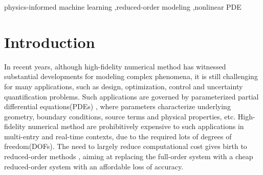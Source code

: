 \documentclass[preprint, 10pt]{elsarticle}
\begin{document}
\begin{frontmatter}
\begin{abstract}
\end{abstract}

\begin{keyword}
   physics-informed machine learning \sep reduced-order modeling \sep nonlinear PDE



\end{keyword}

\end{frontmatter}


\section{Introduction}
In recent years, although high-fidelity numerical method has witnessed substantial developments for modeling complex phenomena, it is still challenging for many applications, such as design, optimization, control and uncertainty quantification problems. Such applications are governed by parameterized partial differential equations(PDEs) \cite{hesthaven2016certified, quarteroni2015reduced}, where parameters characterize underlying geometry, boundary conditions, source terms and physical properties, etc. High-fidelity numerical method are prohibitively expensive to such applications in multi-entry and real-time contexts, due to the required lots of degrees of freedom(DOFs).
The need to largely reduce computational cost gives birth to reduced-order methods \cite{lucia2004reduced}, aiming at replacing the full-order system with a cheap reduced-order system with an affordable loss of accuracy.
\end{document}
